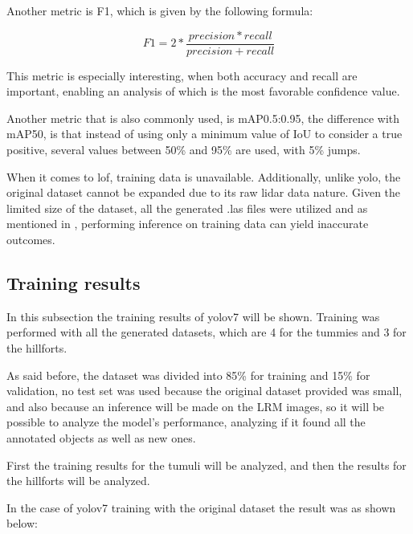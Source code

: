 Another metric is F1, which is given by the following formula:

\begin{equation}
     F1 = 2 * \frac{precision * recall}{precision + recall}
\end{equation}

This metric is especially interesting, when both accuracy and recall are important, enabling an analysis of which is the most favorable confidence value.

Another metric that is also commonly used, is mAP0.5:0.95, the difference with mAP50, is that instead of using only a minimum value of IoU to consider a true positive, several values between 50\% and 95\% are used, with 5\% jumps.

When it comes to lof, training data is unavailable. Additionally, unlike yolo, the original dataset cannot be expanded due to its raw lidar data nature. Given the limited size of the dataset, all the generated .las files were utilized and as mentioned in \cite{lof}, performing inference on training data can yield inaccurate outcomes.

\subsection{Training results}
In this subsection the training results of yolov7 will be shown. Training was performed with all the generated datasets, which are 4 for the tummies and 3 for the hillforts.

As said before, the dataset was divided into 85\% for training and 15\% for validation, no test set was used because the original dataset provided was small, and also because an inference will be made on the LRM images, so it will be possible to analyze the model's performance, analyzing if it found all the annotated objects as well as new ones.

First the training results for the tumuli will be analyzed, and then the results for the hillforts will be analyzed.

In the case of yolov7 training with the original dataset the result was as shown below:

